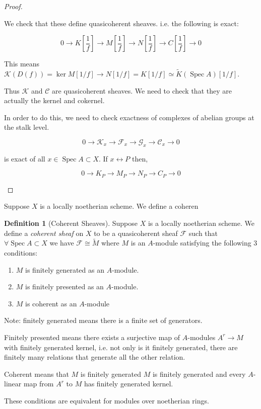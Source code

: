 \documentclass{article}
\theoremstyle{definition}
\newtheorem*{definition}{Definition}
\begin{document}
\begin{proof}
\begin{enumerate}[label=\arabic*)]
            We check that these define quasicoherent sheaves. i.e. the following is exact:

            \[
                0 \to K \left[ \frac{1}{f} \right] \to M \left[ \frac{1}{f} \right] \to N \left[ \frac{1}{f} \right] \to C \left[ \frac{1}{f} \right] \to 0
            \]

            This means \(\mathcal{K}(D(f)) = \ker M[1 / f] \to N[1 / f] = K[1 / f] \simeq \widetilde{K} (\operatorname{Spec} A) [1 / f]\).

            Thus \(\mathcal{K}\) and \(\mathcal{C}\) are quasicoherent sheaves. We need to check that they are actually the kernel and cokernel.

            In order to do this, we need to check exactness of complexes of abelian groups at the stalk level.

            \[
                0 \to \mathcal{K}_x \to \mathcal{F}_x \to \mathcal{G}_x \to \mathcal{C}_x \to 0
            \]

            is exact of all \(x \in \operatorname{Spec} A \subset X\). If \(x \leftrightarrow P\) then,

            \[
                0 \to K_P \to M_P \to N_P \to C_P \to 0
            \]
        \end{enumerate} 
    \end{proof}

    Suppose \(X\) is a locally noetherian scheme. We define a coheren

    \begin{definition}
        [Coherent Sheaves]

        Suppose \(X\) is a locally noetherian scheme. We define a \textit{coherent sheaf} on \(X\) to be a quasicoherent sheaf \(\mathcal{F}\) such that \(\forall \operatorname{Spec} A \subset X\) we have \(\mathcal{F} \cong \widetilde{M}\) where \(M\) is an \(A\)-module satisfying the following 3 conditions:
        
        \begin{enumerate}[label=\arabic*)]
            \item \(M\) is finitely generated as an \(A\)-module.
            \item \(M\) is finitely presented as an \(A\)-module.
            \item \(M\) is coherent as an \(A\)-module 
        \end{enumerate}
        
        Note: finitely generated means there is a finite set of generators.
        
        Finitely presented means there exists a surjective map of \(A\)-modules \(A^r \to M\) with finitely generated kernel, i.e. not only is it finitely generated, there are finitely many relations that generate all the other relation.

        Coherent means that \(M\) is finitely generated \(M\) is finitely generated and every \(A\)-linear map from \(A^r\) to \(M\) has finitely generated kernel.

        These conditions are equivalent for modules over noetherian rings.
    \end{definition}
\end{document}
